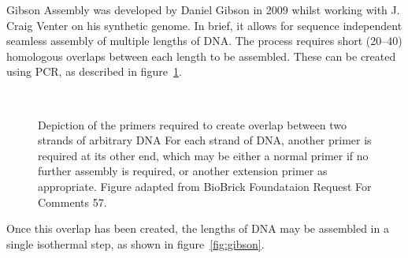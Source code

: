 \documentclass[../main.tex]{subfiles}
\begin{document}
Gibson Assembly was developed by Daniel Gibson\cite{gibson09} in 2009 whilst working with J. Craig Venter on his synthetic genome\cite{venter10}. In brief, it allows for sequence independent seamless assembly of multiple lengths of DNA. The process requires short (\SIrange{20}{40}{\base}) homologous overlaps between each length to be assembled. These can be created using PCR, as described in figure~\ref{fig:gibsonPCR}.
\begin{figure}[h!]
\\
\caption{Depiction of the primers required to create overlap between two strands of arbitrary DNA For each strand of DNA, another primer is required at its other end, which may be either a normal primer if no further assembly is required, or another extension primer as appropriate. Figure adapted from BioBrick Foundataion Request For Comments 57\cite{rfc57}.}
\label{fig:gibsonPCR}
\end{figure}

Once this overlap has been created, the lengths of DNA may be assembled in a single isothermal step, as shown in figure~\ref{fig:gibson}. 
\end{document}
